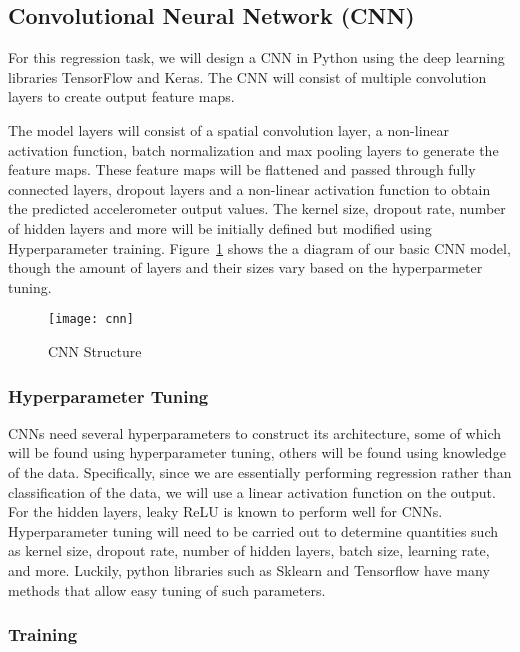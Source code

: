 \documentclass[12pt]{article}
\begin{document}
\subsection{Convolutional Neural Network (CNN)}

For this regression task, we will design a CNN in Python using the deep learning libraries TensorFlow and Keras. The CNN will consist of multiple convolution layers to create output feature maps. \cite{Angrick2019}

The model layers will consist of a spatial convolution layer, a non-linear activation function, batch normalization and max pooling layers to generate the feature maps. These feature maps will be flattened and passed through fully connected layers, dropout layers and a non-linear activation function to obtain the predicted accelerometer output values. The kernel size, dropout rate, number of hidden layers and more will be initially defined but modified using Hyperparameter training. Figure~\ref{cnn_struct} shows the a diagram of our basic CNN model, though the amount of layers and their sizes vary based on the hyperparmeter tuning.

\begin{figure}[h]
  \centering
  \texttt{[image: cnn]}
  \caption{CNN Structure}
  \label{cnn_struct}
\end{figure}

\subsubsection{Hyperparameter Tuning}

CNNs need several hyperparameters to construct its architecture, some of which will be found using hyperparameter tuning, others will be found using knowledge of the data. Specifically, since we are essentially performing regression rather than classification of the data, we will use a linear activation function on the output. For the hidden layers, leaky ReLU is known to perform well for CNNs. Hyperparameter tuning will need to be carried out to determine quantities such as kernel size, dropout rate, number of hidden layers, batch size, learning rate, and more. Luckily, python libraries such as Sklearn and Tensorflow have many methods that allow easy tuning of such parameters.


\subsubsection{Training} 
\end{document}
